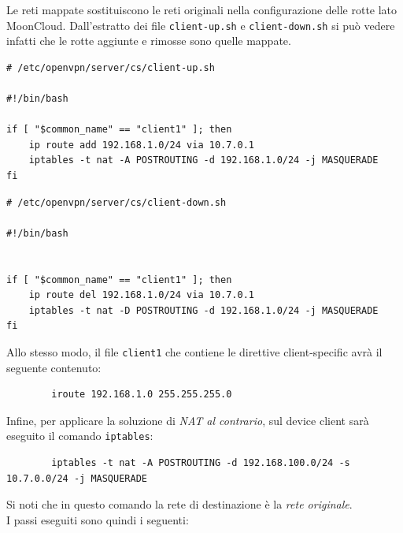 	
	Le reti mappate sostituiscono le reti originali nella configurazione delle rotte lato
	MoonCloud. Dall'estratto dei file \texttt{client-up.sh} e
	\texttt{client-down.sh} si può vedere infatti che le rotte aggiunte e rimosse sono
	quelle mappate.
	\begin{verbatim}
# /etc/openvpn/server/cs/client-up.sh
		
#!/bin/bash
		
if [ "$common_name" == "client1" ]; then
	ip route add 192.168.1.0/24 via 10.7.0.1
	iptables -t nat -A POSTROUTING -d 192.168.1.0/24 -j MASQUERADE
fi
	\end{verbatim}
	\begin{verbatim}
# /etc/openvpn/server/cs/client-down.sh
		
#!/bin/bash
		
		
if [ "$common_name" == "client1" ]; then
	ip route del 192.168.1.0/24 via 10.7.0.1
	iptables -t nat -D POSTROUTING -d 192.168.1.0/24 -j MASQUERADE
fi
	\end{verbatim}
	Allo stesso modo, il file \texttt{client1} che contiene le direttive client-specific
	avrà il seguente contenuto:
	\begin{verbatim}
		iroute 192.168.1.0 255.255.255.0
	\end{verbatim}
	Infine, per applicare la soluzione di \textit{NAT al contrario}, sul device client
	sarà eseguito il comando \texttt{iptables}:
	\begin{verbatim}
		iptables -t nat -A POSTROUTING -d 192.168.100.0/24 -s 10.7.0.0/24 -j MASQUERADE
	\end{verbatim}
	Si noti che in questo comando la rete di destinazione è la \textit{rete originale}.\\
	I passi eseguiti sono quindi i seguenti:

